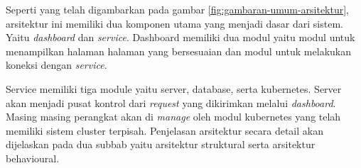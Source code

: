 Seperti yang telah digambarkan pada gambar \ref{fig:gambaran-umum-arsitektur}, arsitektur ini memiliki dua komponen utama yang menjadi dasar dari sistem. Yaitu \textit{dashboard} dan \textit{service}. Dashboard memiliki dua modul yaitu modul untuk menampilkan halaman halaman yang bersesuaian dan modul untuk melakukan koneksi dengan \textit{service}.

Service memiliki tiga module yaitu server, database, serta kubernetes. Server akan menjadi pusat kontrol dari \textit{request} yang dikirimkan melalui \textit{dashboard}. Masing masing perangkat akan di \textit{manage} oleh modul kubernetes yang telah memiliki sistem cluster terpisah. Penjelasan arsitektur secara detail akan dijelaskan pada dua subbab yaitu arsitektur struktural serta arsitektur behavioural.



